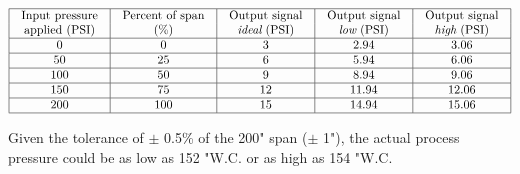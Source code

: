 

$$\vbox{\offinterlineskip
\halign{\strut
\vrule \quad\hfil # \ \hfil & 
\vrule \quad\hfil # \ \hfil & 
\vrule \quad\hfil # \ \hfil & 
\vrule \quad\hfil # \ \hfil & 
\vrule \quad\hfil # \ \hfil \vrule \cr
\noalign{\hrule}
%
Input pressure & Percent of span & Output signal & Output signal & Output signal \cr
%
applied (PSI) & (\%) & {\it ideal} (PSI) & {\it low} (PSI) & {\it high} (PSI) \cr
%
\noalign{\hrule}
%
0 & 0 & 3 & 2.94 & 3.06 \cr
%
\noalign{\hrule}
%
50 & 25 & 6 & 5.94 & 6.06 \cr
%
\noalign{\hrule}
%
100 & 50 & 9 & 8.94 & 9.06 \cr
%
\noalign{\hrule}
%
150 & 75 & 12 & 11.94 & 12.06 \cr
%
\noalign{\hrule}
%
200 & 100 & 15 & 14.94 & 15.06 \cr
%
\noalign{\hrule}
} %
}$$ %

Given the tolerance of $\pm$ 0.5\% of the 200" span ($\pm$ 1"), the actual process pressure could be as low as 152 "W.C. or as high as 154 "W.C.











